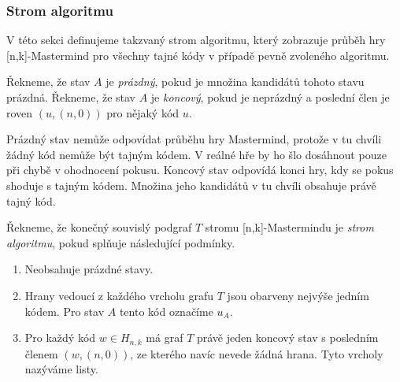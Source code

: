  




\subsubsection{Strom algoritmu}
V této sekci definujeme takzvaný strom algoritmu, který zobrazuje průběh hry [n,k]-Mastermind pro všechny tajné kódy v případě pevně zvoleného algoritmu. 

\begin{definice}\label{kandidat}
  Řekneme, že stav $A$ je \emph{prázdný}, pokud je množina kandidátů tohoto stavu prázdná. Řekneme, že stav $A$ je \emph{koncový}, pokud je neprázdný a poslední člen je roven $(u,(n,0))$ pro nějaký kód $u$.
\end{definice}

Prázdný stav nemůže odpovídat průběhu hry Mastermind, protože v tu chvíli žádný kód nemůže být tajným kódem. V reálné hře by ho šlo dosáhnout pouze při chybě v ohodnocení pokusu. Koncový stav odpovídá konci hry, kdy se pokus shoduje s tajným kódem. Množina jeho kandidátů v tu chvíli obsahuje právě tajný kód. 


\begin{definice}
  Řekneme, že konečný souvislý podgraf $T$ stromu [n,k]-Mastermindu je \emph{strom algoritmu}, pokud splňuje následující podmínky.
  \begin{enumerate}
      \item Neobsahuje prázdné stavy.
      \item Hrany vedoucí z každého vrcholu grafu $T$ jsou obarveny nejvýše jedním kódem. Pro stav $A$ tento kód označíme $u_A$.
      \item Pro každý kód $w \in H_{n,k}$ má graf $T$ právě jeden koncový stav s posledním členem $(w, (n,0))$, ze kterého navíc nevede žádná hrana. Tyto vrcholy nazýváme listy.
  \end{enumerate}
\end{definice}

